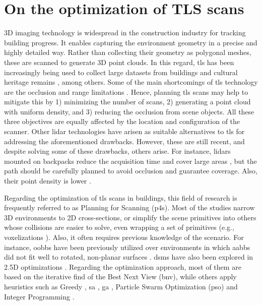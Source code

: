 \section{On the optimization of TLS scans}

3D imaging technology is widespread in the construction industry for tracking building progress. It enables capturing the environment geometry in a precise and highly detailed way. Rather than collecting their geometry as polygonal meshes, these are scanned to generate 3D point clouds. In this regard, \acrshort{tls} has been increasingly being used to collect large datasets from buildings \cite{shariq_revolutionising_2020} and cultural heritage remains \cite{banfi_integration_2019, ham_phased_2020, andriasyan_point_2020}, among others. Some of the main shortcomings of \acrshort{tls} technology are the occlusion and range limitations \cite{soudarissanane_optimizing_2012}. Hence, planning \acrshort{tls} scans may help to mitigate this by 1) minimizing the number of scans, 2) generating a point cloud with uniform density, and 3) reducing the occlusion from scene objects. All these three objectives are equally affected by the location and configuration of the scanner. Other \acrshort{lidar} technologies have arisen as suitable alternatives to \acrshort{tls} for addressing the aforementioned drawbacks. However, these are still recent, and despite solving some of these drawbacks, others arise. For instance, \acrshort{lidar}s mounted on backpacks reduce the acquisition time and cover large areas \cite{rodriguez-gonzalvez_mobile_2017}, but the path should be carefully planned to avoid occlusion and guarantee coverage. Also, their point density is lower \cite{bienert_comparison_2018}.

Regarding the optimization of \acrshort{tls} scans in buildings, this field of research is frequently referred to as Planning for Scanning (\acrshort{p4s}). Most of the studies narrow 3D environments to 2D cross-sections, or simplify the scene primitives into others whose collisions are easier to solve, even wrapping a set of primitives (e.g., voxelizations \cite{wakisaka_optimal_2019}). Also, it often requires previous knowledge of the scenario. For instance, \acrshort{oobb}s have been previously utilized over environments in which \acrshort{aabb}s did not fit well to rotated, non-planar surfaces \cite{li_3d_2022}. \acrshort{dsm}s have also been explored in 2.5D optimizations \cite{starek_viewshed_2020}. Regarding the optimization approach, most of them are based on the iterative find of the Best Next View (\acrshort{bnv}), while others apply heuristics such as Greedy \cite{ giorgini_sensor-based_2019},  \acrshort{sa} \cite{chen_indoor_2018}, \acrshort{ga} \cite{jia_comparison_2017}, Particle Swarm Optimization (\acrshort{pso}) \cite{jia_comparison_2017} and Integer Programming \cite{wakisaka_optimal_2019}.

